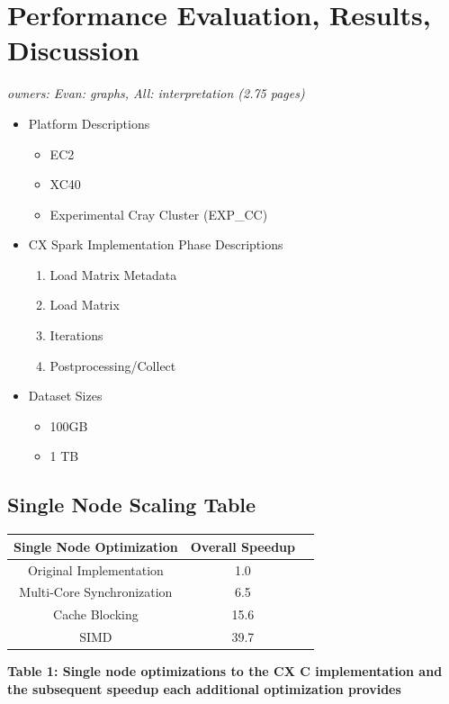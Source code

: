 \section{Performance Evaluation, Results, Discussion}

\textit{owners: Evan: graphs, All: interpretation (2.75 pages)}

\begin{itemize}
\item Platform Descriptions
\begin{itemize}
  \item EC2

  \item XC40
  \item Experimental Cray Cluster (EXP\_CC)
\end{itemize}

\item CX Spark Implementation Phase Descriptions
 \begin{enumerate}
      \item Load Matrix Metadata
      \item Load Matrix
      \item Iterations
      \item Postprocessing/Collect
 \end{enumerate}

 \item Dataset Sizes
 \begin{itemize}
  \item 100GB

  \item 1 TB

\end{itemize}
 \end{itemize}




  \subsection{Single Node Scaling Table}

  \begin{center}
  \begin{tabular}{ |c|c|c| } 
  \hline
  Single Node Optimization & Overall Speedup\\
  \hline
  Original Implementation & 1.0  \\
  Multi-Core Synchronization & 6.5 \\
  Cache Blocking & 15.6 \\
  SIMD & 39.7 \\
  \hline

  \end{tabular}
  \end{center}
  \label{tab:single_node}
  \textbf{Table 1: Single node optimizations to the CX C
  implementation and the subsequent speedup  each additional optimization provides}
 



